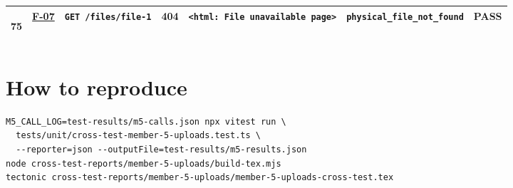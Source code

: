 \documentclass[10pt,a4paper]{article}
\begin{document}
\begin{landscape}
\begin{longtable}{@{}P{0.6cm}P{0.9cm}P{8.5cm}P{1.0cm}P{6.2cm}P{4.2cm}P{1.1cm}@{}}
\hypertarget{call75}{75} & \hyperlink{test-F-07}{F-07} & \texttt{GET /\allowbreak{}files/\allowbreak{}file-\allowbreak{}1} & \textcolor{warnamber}{\textbf{404}} & \texttt{<html:\allowbreak{} File unavailable page>} & \texttt{physical\_\allowbreak{}file\_\allowbreak{}not\_\allowbreak{}found} & \textcolor{passgreen}{\textbf{PASS}} \\
\bottomrule
\end{longtable}
\normalsize
\end{landscape}

\section*{How to reproduce}
\begin{verbatim}
M5_CALL_LOG=test-results/m5-calls.json npx vitest run \
  tests/unit/cross-test-member-5-uploads.test.ts \
  --reporter=json --outputFile=test-results/m5-results.json
node cross-test-reports/member-5-uploads/build-tex.mjs
tectonic cross-test-reports/member-5-uploads/member-5-uploads-cross-test.tex
\end{verbatim}
\end{document}
